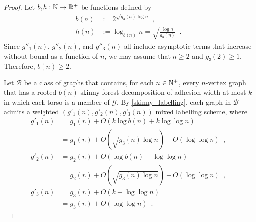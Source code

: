 \documentclass{patmorin}
\renewcommand{\ge}{\geqslant}
\newcommand{\Oh}{O}
\newcommand{\calB}{\mathcal{B}}
\newcommand{\calG}{\mathcal{G}}
\begin{document}
\begin{proof}
  Let $b,h:\mathbb{N}\to\mathbb{R}^+$ be functions defined by
  \begin{align*}
    b(n)
     & :=2^{\sqrt{g_3(n)\log n}}\enspace,                        \\
    h(n)
     & := \log_{b(n)}n = \sqrt{\frac{\log n}{g_3(n)}} \enspace .
  \end{align*}
  Since $g''_1(n)$, $g''_2(n)$, and $g''_3(n)$ all include asymptotic terms that increase without bound as a function of $n$, we may assume that $n\ge 2$ and $g_3(2)\ge 1$.  Therefore, $b(n)\ge 2$.

  Let $\calB$ be a class of graphs that contains, for each $n\in\mathbb{N}^+$, every $n$-vertex graph that has a rooted $b(n)$-skinny forest-decomposition of adhesion-width at most $k$ in which each torso is a member of $\calG$.
  By \cref{skinny_labelling}, each graph in $\calB$ admits a
  weighted $(g'_1(n),g'_2(n),g'_3(n))$ mixed labelling scheme, where
  \begin{align*}
    g'_1(n)
     & = g_1(n) + \Oh(k \log b(n) + k \log\log n)                                 \\
     & = g_1(n) + \Oh\left(\sqrt{g_3(n) \log n}\right) + \Oh(\log\log n)\enspace, \\
    g'_2(n)
     & = g_2(n)+ \Oh(\log b(n) + \log\log n)                                      \\
     & = g_2(n) + \Oh\left(\sqrt{g_3(n) \log n}\right) + \Oh(\log\log n)\enspace, \\
    g'_3(n)
     & = g_3(n) + \Oh(k + \log\log n)                                             \\
     & = g_3(n) + \Oh(\log\log n)\enspace.
  \end{align*}


\end{proof}
\end{document}
